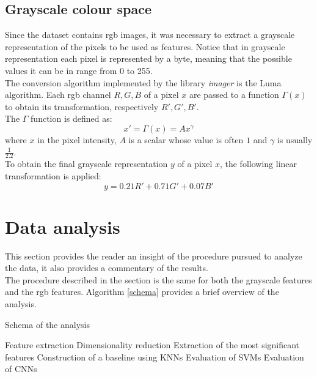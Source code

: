 \documentclass{article}
\begin{document}
\subsection{Grayscale colour space}
Since the dataset contains rgb images, it was necessary to extract a grayscale representation of the pixels to be used as features. Notice that in grayscale representation each pixel is represented by a byte, meaning that the possible values it can be in range from 0 to 255. \\
The conversion algorithm implemented by the library \textit{imager} is the Luma algorithm. Each rgb channel $R, G, B$ of a pixel $x$ are passed to a function $\Gamma(x)$ to obtain its transformation, respectively $R', G', B'$. \\
The $\Gamma$ function is defined as: 
\begin{equation}
 x' = \Gamma(x) = Ax^{\gamma}
\end{equation}
where $x$ in the pixel intensity, $A$ is a scalar whose value is often $1$ and $\gamma$ is usually $\frac{1}{2.2}$.\\
To obtain the final grayscale representation $y$ of a pixel $x$, the following linear transformation is applied: \cite{grayscaleconversion}
\begin{equation}
 y = 0.21 R' + 0.71 G' + 0.07  B'
\end{equation}

\section{Data analysis}
This section provides the reader an insight of the procedure pursued to analyze the data, it also provides a commentary of the results.\\
The procedure described in the section is the same for both the grayscale features and the rgb features. Algorithm \ref{schema} provides a brief overview of the analysis.

\begin{algorithm}[H] 
   \caption{Schema of the analysis} \label{schema}
    \begin{algorithmic}[1]
    \State Feature extraction
    \State Dimensionality reduction
    \State Extraction of the most significant features
    \State Construction of a baseline using KNNs
    \State Evaluation of SVMs
    \State Evaluation of CNNs
\end{algorithmic}
\end{algorithm}
\end{document}
